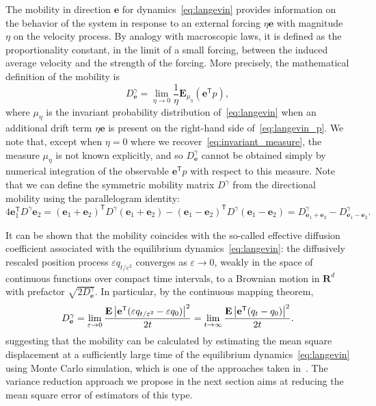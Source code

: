 \documentclass[11pt,a4paper]{article}
\newcommand{\expect}[0]{\mathbf{E}}
\newcommand{\real}{\mathbf R}
\newcommand{\vect}[1]{\boldsymbol{\mathbf #1}}
\renewcommand{\t}{\mathsf T}
\theoremstyle{plain}
\numberwithin{equation}{section}
\begin{document}
The mobility in direction $\vect e$ for dynamics~\eqref{eq:langevin} provides information on the behavior of the system
in response to an external forcing $\eta \vect e$ with magnitude~$\eta$ on the velocity process.
By analogy with macroscopic laws,
it is defined as the proportionality constant,
in the limit of a small forcing,
between the induced average velocity and the strength  of the forcing.
More precisely,
the mathematical definition of the mobility is
\[
    D^{\gamma}_{\vect e} = \lim_{\eta \to 0} \frac{1}{\eta}\expect_{\mu_{\eta}} (\vect e^\t p),
\]
where $\mu_{\eta}$ is the invariant probability distribution of~\eqref{eq:langevin} when
an additional drift term $\eta \vect e$ is present on the right-hand side of~\eqref{eq:langevin_p}.
We note that, except when $\eta = 0$ where we recover~\eqref{eq:invariant_measure},
the measure $\mu_{\eta}$ is not known explicitly,
and so $D^{\gamma}_{\vect e}$ cannot be obtained simply by numerical integration of the observable $\vect e^\t p$ with respect to this measure.
Note that we can define the symmetric mobility matrix $D^{\gamma}$ from the directional mobility
using the parallelogram identity:
\[
    4 \vect e_1^\t D^{\gamma} \vect e_2
    = (\vect e_1 + \vect e_2) ^\t D^{\gamma} (\vect e_1 + \vect e_2)
    - (\vect e_1 - \vect e_2) ^\t D^{\gamma} (\vect e_1 - \vect e_2)
    = D^{\gamma}_{\vect e_1 + \vect e_2} - D^{\gamma}_{\vect e_1 - \vect e_2}.
\]

It can be shown that the mobility coincides with the so-called effective diffusion coefficient associated with the equilibrium dynamics~\eqref{eq:langevin}:
the diffusively rescaled position process $\varepsilon q_{t/\varepsilon^2}$ converges as $\varepsilon \to 0$,
weakly in the space of continuous functions over compact time intervals,
to a Brownian motion in $\real^d$ with prefactor $\sqrt{2 D^{\gamma}_{\vect e}}$.
In particular, by the continuous mapping theorem,
\[
    D^{\gamma}_{\vect e}
    =\lim_{\varepsilon \to 0} \frac{\expect\abs{\vect e^\t (\varepsilon q_{t/\varepsilon^2} - \varepsilon q_0)}^2}{2 t}
    =\lim_{t \to \infty} \frac{\expect \abs{\vect e^\t (q_t - q_0)}^2}{2t}.
\]
suggesting that the mobility can be calculated by
estimating the mean square displacement at a sufficiently large time of the equilibrium dynamics~\eqref{eq:langevin}
using Monte Carlo simulation,
which is one of the approaches taken in~\cite{MR2427108}.
The variance reduction approach we propose in the next section aims at reducing the mean square error of estimators of this type.
\end{document}
